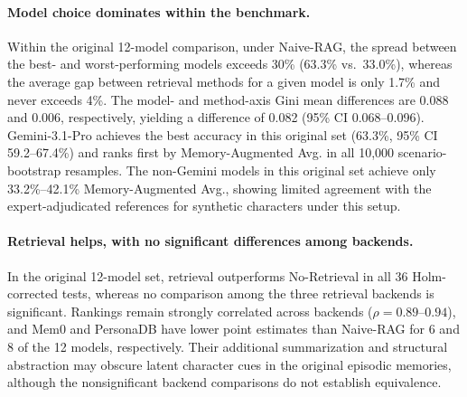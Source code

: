 \documentclass[11pt]{article}
\begin{document}
\paragraph{Model choice dominates within the benchmark.} Within the original 12-model comparison, under Naive-RAG, the spread between the best- and worst-performing models exceeds 30\% (63.3\% vs.\ 33.0\%), whereas the average gap between retrieval methods for a given model is only 1.7\% and never exceeds 4\%. The model- and method-axis Gini mean differences are 0.088 and 0.006, respectively, yielding a difference of 0.082 (95\% CI 0.068--0.096). Gemini-3.1-Pro achieves the best accuracy in this original set (63.3\%, 95\% CI 59.2--67.4\%) and ranks first by Memory-Augmented Avg. in all 10{,}000 scenario-bootstrap resamples. The non-Gemini models in this original set achieve only 33.2\%--42.1\% Memory-Augmented Avg., showing limited agreement with the expert-adjudicated references for synthetic characters under this setup.

\begin{table}[t]
\centering
\caption{Memory-content ablation on the 176-item subset. Accuracy is averaged over the original 12 LLMs; the four added models are not included.}
\label{tab:memory_ablation_summary}
\setlength{\tabcolsep}{2pt}
\small
{}
\end{table}

\paragraph{Retrieval helps, with no significant differences among backends.} In the original 12-model set, retrieval outperforms No-Retrieval in all 36 Holm-corrected tests, whereas no comparison among the three retrieval backends is significant. Rankings remain strongly correlated across backends ($\rho=0.89\text{--}0.94$), and Mem0 and PersonaDB have lower point estimates than Naive-RAG for 6 and 8 of the 12 models, respectively. Their additional summarization and structural abstraction may obscure latent character cues in the original episodic memories, although the nonsignificant backend comparisons do not establish equivalence.
\end{document}

